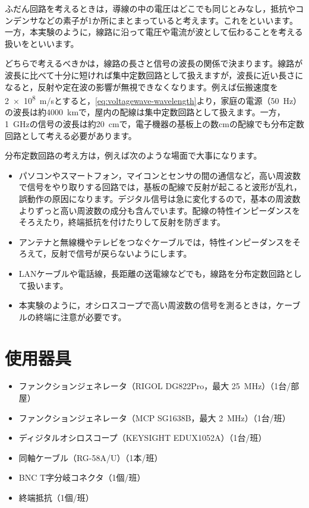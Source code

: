 \begin{hosoku}
ふだん回路を考えるときは，導線の中の電圧はどこでも同じとみなし，抵抗やコンデンサなどの素子が1か所にまとまっていると考えます。これをといいます。一方，本実験のように，線路に沿って電圧や電流が波として伝わることを考える扱いをといいます。

どちらで考えるべきかは，線路の長さと信号の波長の関係で決まります。線路が波長に比べて十分に短ければ集中定数回路として扱えますが，波長に近い長さになると，反射や定在波の影響が無視できなくなります。例えば伝搬速度を\SI{2e8}{m/s}とすると，\cref{eq:voltagewave-wavelength}より，家庭の電源（\SI{50}{Hz}）の波長は約\SI{4000}{km}で，屋内の配線は集中定数回路として扱えます。一方，\SI{1}{GHz}の信号の波長は約\SI{20}{cm}で，電子機器の基板上の数cmの配線でも分布定数回路として考える必要があります。

分布定数回路の考え方は，例えば次のような場面で大事になります。
\begin{itemize}
  \item {}パソコンやスマートフォン，マイコンとセンサの間の通信など，高い周波数で信号をやり取りする回路では，基板の配線で反射が起こると波形が乱れ，誤動作の原因になります。デジタル信号は急に変化するので，基本の周波数よりずっと高い周波数の成分も含んでいます。配線の特性インピーダンスをそろえたり，終端抵抗を付けたりして反射を防ぎます。
  \item {}アンテナと無線機やテレビをつなぐケーブルでは，特性インピーダンスをそろえて，反射で信号が戻らないようにします。
  \item {}LANケーブルや電話線，長距離の送電線などでも，線路を分布定数回路として扱います。
  \item {}本実験のように，オシロスコープで高い周波数の信号を測るときは，ケーブルの終端に注意が必要です。
\end{itemize}
\end{hosoku}

\section{使用器具}

\begin{equipment}
\begin{itemize}
  \item ファンクションジェネレータ（RIGOL DG822Pro，最大 \SI{25}{MHz}）（1台/部屋）
  \item ファンクションジェネレータ（MCP SG1638B，最大 \SI{2}{MHz}）（1台/班）
  \item ディジタルオシロスコープ（KEYSIGHT EDUX1052A）（1台/班）
  \item 同軸ケーブル（RG-58A/U）（1本/班）
  \item BNC T字分岐コネクタ（1個/班）
  \item 終端抵抗（1個/班）
\end{itemize}
\end{equipment}


